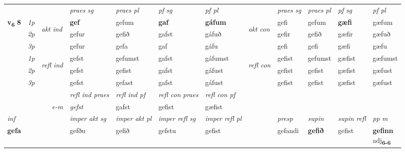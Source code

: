 \begin{longtable}[l]{X>{\footnotesize\itshape}llXXXXlXXXX}
\midrule

 & &   & \textit{praes sg}  & \textit{praes pl}    & \textit{ pf sg} & \textit{pf pl} & & \textit{praes sg}  & \textit{praes pl}    & \textit{pf sg} & \textit{pf pl }  \\ \cmidrule{4-7} \cmidrule{9-12}
 \multirow{2}{*}{{{\textbf{v{\textsubscript{6}}} \Large{\textbf{8}}}}}  & 1p & \multirow{3}{*}{\begin{turn}{90}\textit{akt ind}\end{turn}} & \textbf{gef} & gefum & \textbf{gaf} & \textbf{gáfum} & \multirow{3}{*}{\begin{turn}{90}\textit{akt con}\end{turn}} &gefi & gefum & \textbf{gæfi} & gæfum\\*
 & 2p &  &  gefur  & gefið & gafst & gáfuð & & gefir & gefið & gæfir & gæfuð \\*
 & 3p &  & gefur & gefa & gaf & gáfu & & gefi & gefi& gæfi & gæfu \\*
\cmidrule{4-7} \cmidrule{9-12}
 & 1p & \multirow{3}{*}{\begin{turn}{90}\textit{refl ind}\end{turn}}  & gefst & gefumst & gafst & gáfumst & \multirow{3}{*}{\begin{turn}{90}\textit{refl con}\end{turn}}  &gefist & gefumst & gæfist & gæfumst \\*
 & 2p &  & gefst & gefist & gafst & gáfust & &gefist & gefist & gæfist & gæfust \\*
 & 3p  & & gefst & gefast & gafst & gáfust & & gefist & gefist& gæfist & gæfust \\*
\cmidrule{4-7} \cmidrule{9-12}

 & && \textit{refl ind praes} & \textit{refl ind pf} & \textit{refl con praes} & \textit{refl con pf} \\*
\multicolumn{3}{r}{\textit{e-m}}& gefst & gafst & gefist & gæfist \\*

\cmidrule{4-7}
   {\textit{inf}} & &  & \textit{imper akt sg} & \textit{imper akt pl} & \textit{imper refl sg} & \textit{imper refl pl} && \textit{presp} & \textit{supin} & \textit{supin refl} & \textit{pp m} \\*
  {\textbf{gefa}} & && gefðu  & gefið & gefstu & gefist && gefandi &  \textbf{gefið} & gefist & \specialcell{\textbf{gefinn} \\ adj\textbf{\textsubscript{6-6}}} \\*


\end{longtable}
